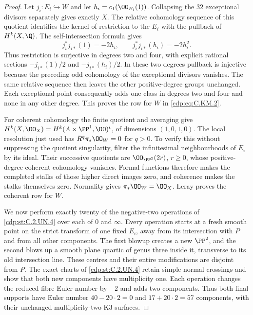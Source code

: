 \begin{proof}
Let $j_i:E_i\hookrightarrow W$ and let
$h_i=c_1(\OO_{E_i}(1))$. Collapsing the $32$ exceptional
divisors separately gives exactly $X$. The relative
cohomology sequence of this quotient identifies the
kernel of restriction to the $E_i$ with the pullback
of $H^k(X,\Q)$. The self-intersection formula gives
\[
 j_i^*j_{i*}(1)=-2h_i,
       \qquad j_i^*j_{i*}(h_i)=-2h_i^2.                 \tag{C.KM.10}\label{cdp:eq:C.KM.10}
\]
Thus restriction is surjective in degrees two and four,
with explicit rational sections $-j_{i*}(1)/2$ and
$-j_{i*}(h_i)/2$. In these two degrees pullback is
injective because the preceding odd cohomology of the
exceptional divisors vanishes. The same relative
sequence then leaves the other positive-degree groups
unchanged. Each exceptional point consequently adds one
class in degrees two and four and none in any other
degree. This proves the row for $W$ in \eqref{cdp:eq:C.KM.2}.

For coherent cohomology the finite quotient and averaging
give
$H^k(X,\OO_X)=H^k(A\times\PP^1,\OO)^{\iota}$,
of dimensions $(1,0,1,0)$. The local resolution just
used has $R^q\pi_*\OO_W=0$ for $q>0$. To verify this
without suppressing the quotient singularity, filter the
infinitesimal neighbourhoods of $E_i$ by its ideal.
Their successive quotients are $\OO_{\PP^2}(2r)$,
$r\ge0$, whose positive-degree coherent cohomology
vanishes. Formal functions therefore makes the completed
stalks of those higher direct images zero, and coherence
makes the stalks themselves zero. Normality gives
$\pi_*\OO_W=\OO_X$. Leray proves the coherent row for
$W$.

We now perform exactly twenty of the negative-two
operations of \ref{cdp:st:C.2.UN.4} over each of $0$ and $\infty$.
Every operation starts at a fresh smooth point on the
strict transform of one fixed $E_i$, away from its
intersection with $P$ and from all other components.
The first blowup creates a new $\PP^2$, and the second
blows up a smooth plane quartic of genus three inside
it, transverse to its old intersection line. These
centres and their entire modifications are disjoint
from $P$. The exact charts of \ref{cdp:st:C.2.UN.4} retain simple
normal crossings and show that both new components
have multiplicity one. Each operation changes the
reduced-fibre Euler number by $-2$ and adds two
components. Thus both final supports have Euler number
$40-20\cdot2=0$ and $17+20\cdot2=57$ components,
with their unchanged multiplicity-two K3 surfaces.


\end{proof}
